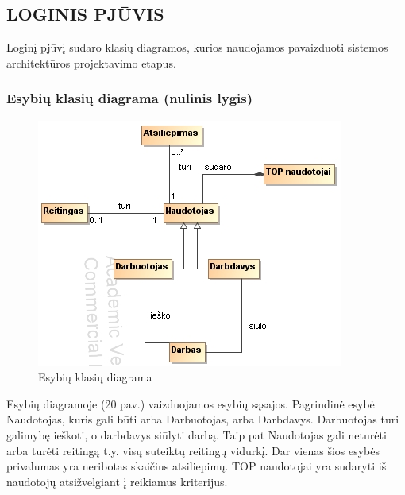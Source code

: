 \documentclass{VUMIFPSkursinis}
\begin{document}
\subsection{LOGINIS PJŪVIS}
Loginį pjūvį sudaro klasių diagramos, kurios naudojamos pavaizduoti sistemos architektūros projektavimo etapus.
\subsubsection{Esybių klasių diagrama (nulinis lygis)}
\begin{figure}[H]
\centering
\includegraphics[scale=1, frame]{img/esybiu.png}
\caption{Esybių klasių diagrama}
\end{figure}
Esybių diagramoje (20 pav.) vaizduojamos esybių sąsajos. Pagrindinė esybė Naudotojas, kuris gali būti arba Darbuotojas, arba Darbdavys. Darbuotojas turi galimybę ieškoti, o darbdavys siūlyti darbą. Taip pat Naudotojas gali neturėti arba turėti reitingą  t.y. visų suteiktų reitingų vidurkį.  Dar vienas šios esybės privalumas yra neribotas skaičius atsiliepimų. TOP naudotojai yra sudaryti iš naudotojų atsižvelgiant į reikiamus kriterijus.
\end{document}
